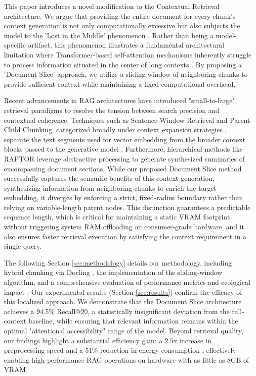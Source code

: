 \documentclass[conference]{IEEEtran}
\begin{document}
This paper introduces a novel modification to the Contextual Retrieval architecture. We argue that providing the entire document for every chunk's context generation is not only computationally excessive but also subjects the model to the 'Lost in the Middle' phenomenon \cite{liu2023lostmiddlelanguagemodels}. Rather than being a model-specific artifact, this phenomenon illustrates a fundamental architectural limitation where Transformer-based self-attention mechanisms inherently struggle to process information situated in the center of long contexts \cite{guo2024serialpositioneffectslarge, lee2025quantifyingpositionalbiasestext}. By proposing a 'Document Slice' approach, we utilize a sliding window of neighboring chunks to provide sufficient context while maintaining a fixed computational overhead.

Recent advancements in RAG architectures have introduced "small-to-large" retrieval paradigms to resolve the tension between search precision and contextual coherence. Techniques such as Sentence-Window Retrieval and Parent-Child Chunking, categorized broadly under context expansion strategies \cite{gao2024retrievalaugmentedgenerationlargelanguage}, separate the text segments used for vector embedding from the broader context blocks passed to the generative model \cite{Liu_LlamaIndex_2022}. Furthermore, hierarchical methods like RAPTOR \cite{sarthi2024raptorrecursiveabstractiveprocessing} leverage abstractive processing to generate synthesized summaries of encompassing document sections. While our proposed Document Slice method successfully captures the semantic benefits of this context generation, synthesizing information from neighboring chunks to enrich the target embedding, it diverges by enforcing a strict, fixed-radius boundary rather than relying on variable-length parent nodes. This distinction guarantees a predictable sequence length, which is critical for maintaining a static VRAM footprint without triggering system RAM offloading on consumer-grade hardware, and it also ensures faster retrieval execution by satisfying the context requirement in a single query.

The following Section \ref{sec:methodology} details our methodology, including hybrid chunking via Docling \cite{auer2024doclingtechnicalreport, docling2024chunkingdocumentation}, the implementation of the sliding-window algorithm, and a comprehensive evaluation of performance metrics and ecological impact \cite{strubell2019energycost, codecarbon_software}. Our experimental results (Section \ref{sec:results}) confirm the efficacy of this localized approach. We demonstrate that the Document Slice architecture achieves a 94.5\% Recall@20, a statistically insignificant deviation from the full-context baseline, while ensuring that relevant information remains within the optimal "attentional accessibility" range of the model. Beyond retrieval quality, our findings highlight a substantial efficiency gain: a 2.5x increase in preprocessing speed and a 51\% reduction in energy consumption \cite{tabbakh2024GreenAI}, effectively enabling high-performance RAG operations on hardware with as little as 8GB of VRAM.
\end{document}
